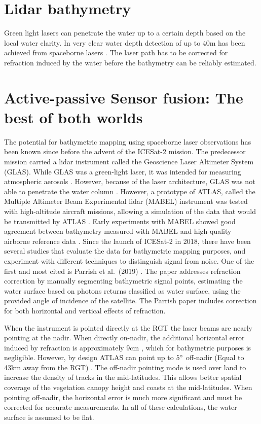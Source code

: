 \section{Lidar bathymetry}

Green light lasers can penetrate the water up to a certain depth based on the local water clarity. In very clear water depth detection of up to 40m has been achieved from spaceborne lasers \parencite{Parrish2019}. The laser path has to be corrected for refraction induced by the water before the bathymetry can be reliably estimated.

\section{Active-passive Sensor fusion: The best of both worlds}

The potential for bathymetric mapping using spaceborne laser observations has been known since before the advent of the ICESat-2 mission. The predecessor mission carried a lidar instrument called the Geoscience Laser Altimeter System (GLAS). While GLAS was a green-light laser, it was intended for measuring atmospheric aerosols \parencite{Abshire2005}. However, because of the laser architecture, GLAS was not able to penetrate the water column \parencite{Forfinski-Sarkozi2016}. However, a prototype of ATLAS, called the Multiple Altimeter Beam Experimental lidar (MABEL) instrument was tested with high-altitude aircraft missions, allowing a simulation of the data that would be transmitted by ATLAS \parencite{Mcgill2013}. Early experiments with MABEL showed good agreement between bathymetry measured with MABEL and high-quality airborne reference data \parencite{Jasinski2016,Forfinski-Sarkozi2016}. Since the launch of ICESat-2 in 2018, there have been several studies that evaluate the data for bathymetric mapping purposes, and experiment with different techniques to distinguish signal from noise. One of the first and most cited is Parrish et al.~(2019) \parencite{Parrish2019}. The paper addresses refraction correction by manually segmenting bathymetric signal points, estimating the water surface based on photons returns classified as water surface, using the provided angle of incidence of the satellite. The Parrish paper includes correction for both horizontal and vertical effects of refraction.

When the instrument is pointed directly at the RGT the laser beams are nearly pointing at the nadir. When directly on-nadir, the additional horizontal error induced by refraction is approximately 9cm \parencite{Parrish2019}, which for bathymetric purposes is negligible. However, by design ATLAS can point up to $5 \degree$ off-nadir (Equal to 43km away from the RGT) \parencite{Magruder2021}. The off-nadir pointing mode is used over land to increase the density of tracks in the mid-latitudes. This allows better spatial coverage of the vegetation canopy height and coasts at the mid-latitudes. When pointing off-nadir, the horizontal error is much more significant and must be corrected for accurate measurements. In all of these calculations, the water surface is assumed to be flat.

